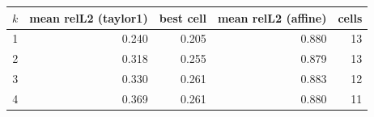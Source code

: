\begin{tabular}{rrrrr}
\toprule
$k$ & mean relL2 (taylor1) & best cell & mean relL2 (affine) & cells \\
\midrule
1 & 0.240 & 0.205 & 0.880 & 13 \\
2 & 0.318 & 0.255 & 0.879 & 13 \\
3 & 0.330 & 0.261 & 0.883 & 12 \\
4 & 0.369 & 0.261 & 0.880 & 11 \\
\bottomrule
\end{tabular}
